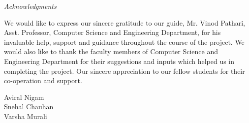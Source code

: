 \newpage
\thispagestyle{empty}

\begin{center}
\emph{\LARGE Acknowledgments}\\[1.5cm]
\end{center}
\normalsize
We would like to express our sincere gratitude to our guide, Mr. Vinod Pathari, Asst. Professor, Computer Science and Engineering Department, for his invaluable help, support and guidance throughout the course of the project. We would also like to thank the faculty members of Computer Science and Engineering Department for their suggestions and inputs which helped us in completing the project. Our sincere appreciation to our fellow students for their co-operation and support.\\[1.0cm]

\begin{flushright}
Aviral Nigam \\ 
Snehal Chauhan\\
Varsha Murali\\
\end{flushright}

